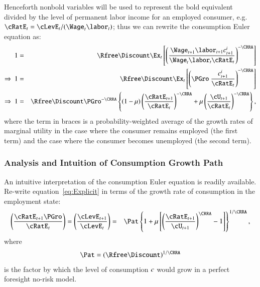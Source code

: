 \documentclass[titlepage,abstract]{\econtex}\newcommand{\texname}{ctDiscrete}
\begin{document}
Henceforth nonbold variables will be used to represent the bold equivalent divided by the level of permanent labor income for an employed consumer, e.g.\ $\cRatE_{t}=\cLevE_{t}/(\Wage_{t}\labor_{t})$; thus we can rewrite the consumption Euler equation as:%
\begin{eqnarray}
  1         & = & \Rfree\Discount \Ex_{t}\left[\left(\frac{\Wage_{t+1}\labor_{t+1}{c}^{i}_{t+1}}{\Wage_{t}\labor_{t}\cRatE_{t}}\right)^{-\CRRA} \right]
\nonumber%
\\
\Rightarrow \
  1        & = & \Rfree\Discount \Ex_{t}\left[\left(\PGro \ \frac{{c}^{i}_{t+1}}{\cRatE_{t}}\right)^{-\CRRA} \right] \nonumber
\\
\Rightarrow \
  1        & = & \Rfree\Discount\PGro^{-\CRRA} \left\{(1-\urate)\left(\frac{\cRatE_{t+1}}{\cRatE_{t}}\right)^{-\CRRA}+\urate \left(\frac{\cU_{t+1}}{\cRatE_{t}}\right)^{-\CRRA}\right\}
\label{eq:Explicit}
,
\end{eqnarray}
where the term in braces is a probability-weighted average of the growth rates of marginal utility in the case where the consumer remains employed (the first term) and the case where the consumer becomes unemployed (the second term).


\subsubsection{Analysis and Intuition of Consumption Growth Path}


An intuitive interpretation of the consumption Euler equation is readily available. Re-write equation~\eqref{eq:Explicit} in terms of the growth rate of consumption in the employment state:
\begin{eqnarray}
  \left(\frac{\cRatE_{t+1} \PGro}{\cRatE_{t}}\right)  = \left(\frac{\cLevE_{t+1}}{\cLevE_{t}}\right) 
  & = & 
  \Pat \left\{1+\urate\left[\left(\frac{\cRatE_{t+1}}{\cU_{t+1}}\right)^{\CRRA}-1\right]\right\}^{1/\CRRA}
\label{eq:cedel}
,
\end{eqnarray}
where 
\begin{eqnarray}
\Pat = (\Rfree\Discount)^{1/\CRRA}
\label{eq:PatPGro}
\end{eqnarray}
is the factor by which the level of consumption $c$ would grow in a perfect foresight no-risk model. 
\end{document}
